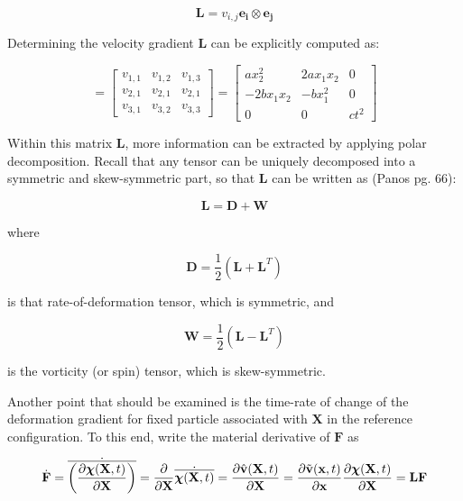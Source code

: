\documentclass[a4paper]{article}
\begin{document}
\begin{equation}
    \mathbf{L} = v_{i,j} \mathbf{e_i}\otimes\mathbf{e_j}
\end{equation}

Determining the velocity gradient $\mathbf{L}$ can be explicitly computed as:

\begin{equation*}
    [L_{ij}] = 
    \begin{bmatrix}
    v_{1,1} & v_{1,2} & v_{1,3} \\
    v_{2,1} & v_{2,1} & v_{2,1} \\
    v_{3,1} & v_{3,2} & v_{3,3}
  \end{bmatrix} = 
  \begin{bmatrix}
    a x_2^2 & 2 a x_1 x_2 & 0 \\
    -2 b x_1 x_2 & -b x_1^2 & 0  \\
    0 & 0 & c t^2 
  \end{bmatrix}
\end{equation*}

Within this matrix $\mathbf{L}$, more information can be extracted by applying polar decomposition. Recall that any tensor can be uniquely decomposed into a symmetric and skew-symmetric part, so that $\mathbf{L}$ can be written as (Panos pg. 66): 

\begin{equation}\label{eqn 31}
    \mathbf{L} = \mathbf{D} + \mathbf{W}
\end{equation}

where 

\begin{equation}
    \mathbf{D} = \frac{1}{2}(\mathbf{L} + \mathbf{L}^T)
\end{equation}

is that rate-of-deformation tensor, which is symmetric, and

\begin{equation}
    \mathbf{W} = \frac{1}{2}(\mathbf{L} - \mathbf{L}^T)
\end{equation}

is the vorticity (or spin) tensor, which is skew-symmetric. 

Another point that should be examined is the time-rate of change of the deformation gradient for fixed particle associated with $\mathbf{X}$ in the reference configuration. To this end, write the material derivative of $\mathbf{F}$ as 

\begin{equation}\label{eqn 34}
    \dot{\mathbf{F}} = \dot{\overline{\biggl(\frac{\partial\boldsymbol{\chi}(\mathbf{X},t)}{\partial \mathbf{X}}\biggr)}} = \frac{\partial}{\partial \mathbf{X}} \dot{\overline{\boldsymbol{\chi}(\mathbf{X},t)}} = \frac{\partial \hat{\mathbf{v}}(\mathbf{X},t)}{\partial \mathbf{X}} = \frac{\partial \Tilde{\mathbf{v}}(\mathbf{x},t)}{\partial \mathbf{x}} \frac{\partial \boldsymbol{\chi}(\mathbf{X},t)}{\partial \mathbf{X}} = \mathbf{L} \mathbf{F}
\end{equation}
\end{document}
